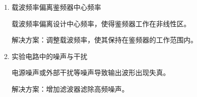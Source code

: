 \documentclass[UTF8]{ctexart}
\begin{document}
\begin{enumerate}
\begin{enumerate}
        \item 载波频率偏离鉴频器中心频率
        
        载波频率偏离设计中心频率，使得鉴频器工作在非线性区。
        
        解决方案：调整载波频率，使其保持在鉴频器的工作范围内。

        \item 实验电路中的噪声与干扰
        
        电源噪声或外部干扰等噪声导致输出波形出现失真。

        解决方案：增加滤波器滤除高频噪声。
        
    \end{enumerate}
    
\end{enumerate}
\end{document}
